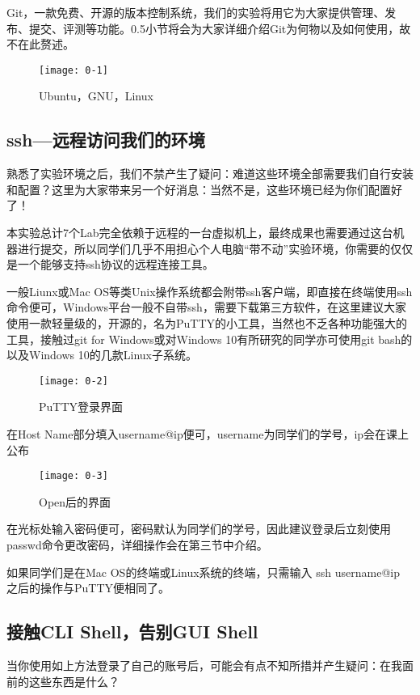 Git，一款免费、开源的版本控制系统，我们的实验将用它为大家提供管理、发布、提交、评测等功能。0.5小节将会为大家详细介绍Git为何物以及如何使用，故不在此赘述。

\begin{figure}[htbp]
  \centering
  \texttt{[image: 0-1]}
  \caption{Ubuntu，GNU，Linux}\label{fig:0-1}
\end{figure}

\subsection{ssh—远程访问我们的环境}

熟悉了实验环境之后，我们不禁产生了疑问：难道这些环境全部需要我们自行安装和配置？这里为大家带来另一个好消息：当然不是，这些环境已经为你们配置好了！

本实验总计7个Lab完全依赖于远程的一台虚拟机上，最终成果也需要通过这台机器进行提交，所以同学们几乎不用担心个人电脑“带不动”实验环境，你需要的仅仅是一个能够支持ssh协议的远程连接工具。

一般Liunx或Mac OS等类Unix操作系统都会附带ssh客户端，即直接在终端使用ssh命令便可，Windows平台一般不自带ssh，需要下载第三方软件，在这里建议大家使用一款轻量级的，开源的，名为PuTTY的小工具，当然也不乏各种功能强大的工具，接触过git for Windows或对Windows 10有所研究的同学亦可使用git bash的以及Windows 10的几款Linux子系统。

\begin{figure}[htbp]
  \centering
  \texttt{[image: 0-2]}
  \caption{PuTTY登录界面}\label{fig:0-2}
\end{figure}

在Host Name部分填入username@ip便可，username为同学们的学号，ip会在课上公布

\begin{figure}[htbp]
  \centering
  \texttt{[image: 0-3]}
  \caption{Open后的界面}\label{fig:0-3}
\end{figure}

在光标处输入密码便可，密码默认为同学们的学号，因此建议登录后立刻使用passwd命令更改密码，详细操作会在第三节中介绍。

如果同学们是在Mac OS的终端或Linux系统的终端，只需输入 ssh username@ip 之后的操作与PuTTY便相同了。

\subsection{接触CLI Shell，告别GUI Shell}

当你使用如上方法登录了自己的账号后，可能会有点不知所措并产生疑问：在我面前的这些东西是什么？

